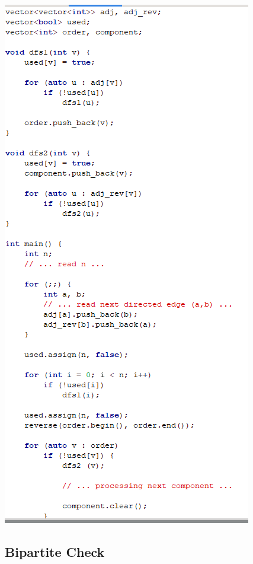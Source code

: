 \documentclass[11pt,twocolumn]{article}
\begin{document}
\includegraphics[scale=0.8]{kosaraju}

\subsection{Bipartite Check}
\end{document}
